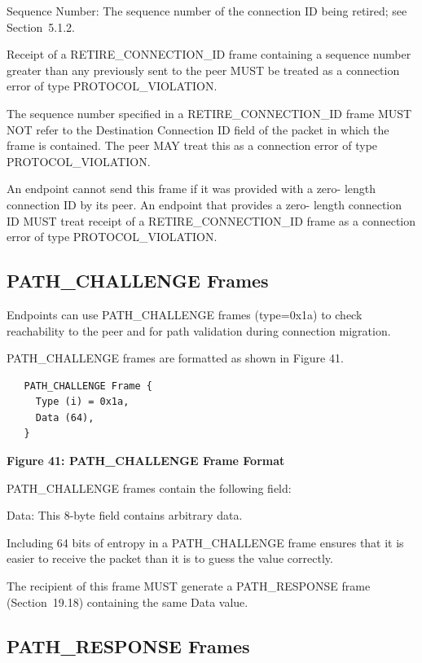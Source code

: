 \documentclass{article}
\begin{document}
Sequence Number:  The sequence number of the connection ID being retired; see Section~5.1.2.

Receipt of a RETIRE\_CONNECTION\_ID frame containing a sequence number greater than any previously sent to the peer MUST be treated as a connection error of type PROTOCOL\_VIOLATION.

The sequence number specified in a RETIRE\_CONNECTION\_ID frame MUST NOT refer to the Destination Connection ID field of the packet in which the frame is contained.  The peer MAY treat this as a connection error of type PROTOCOL\_VIOLATION.

An endpoint cannot send this frame if it was provided with a zero- length connection ID by its peer.  An endpoint that provides a zero- length connection ID MUST treat receipt of a RETIRE\_CONNECTION\_ID frame as a connection error of type PROTOCOL\_VIOLATION.

\subsection{PATH\_CHALLENGE Frames}

Endpoints can use PATH\_CHALLENGE frames (type=0x1a) to check reachability to the peer and for path validation during connection migration.

PATH\_CHALLENGE frames are formatted as shown in Figure 41.

\begin{verbatim}
   PATH_CHALLENGE Frame {
     Type (i) = 0x1a,
     Data (64),
   }
\end{verbatim}

\begin{center}
\textbf{Figure 41: PATH\_CHALLENGE Frame Format}
\end{center}

PATH\_CHALLENGE frames contain the following field:

Data:  This 8-byte field contains arbitrary data.

Including 64 bits of entropy in a PATH\_CHALLENGE frame ensures that it is easier to receive the packet than it is to guess the value correctly.

The recipient of this frame MUST generate a PATH\_RESPONSE frame (Section~19.18) containing the same Data value.

\subsection{PATH\_RESPONSE Frames}
\end{document}
